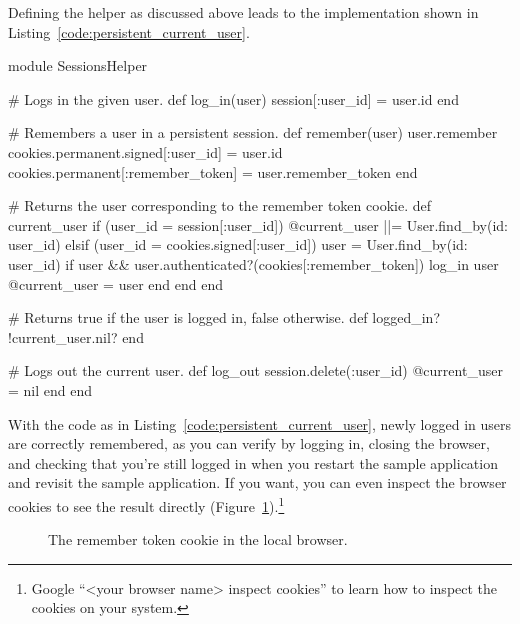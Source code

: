 Defining the  helper as discussed above leads to the implementation shown in Listing~\ref{code:persistent_current_user}.

\begin{codelisting}
\label{code:persistent_current_user}
\begin{code}
module SessionsHelper

  # Logs in the given user.
  def log_in(user)
    session[:user_id] = user.id
  end

  # Remembers a user in a persistent session.
  def remember(user)
    user.remember
    cookies.permanent.signed[:user_id] = user.id
    cookies.permanent[:remember_token] = user.remember_token
  end

  # Returns the user corresponding to the remember token cookie.
  def current_user
    if (user_id = session[:user_id])
      @current_user ||= User.find_by(id: user_id)
    elsif (user_id = cookies.signed[:user_id])
      user = User.find_by(id: user_id)
      if user && user.authenticated?(cookies[:remember_token])
        log_in user
        @current_user = user
      end
    end
  end

  # Returns true if the user is logged in, false otherwise.
  def logged_in?
    !current_user.nil?
  end

  # Logs out the current user.
  def log_out
    session.delete(:user_id)
    @current_user = nil
  end
end
\end{code}
\end{codelisting}

With the code as in Listing~\ref{code:persistent_current_user}, newly logged in users are correctly remembered, as you can verify by logging in, closing the browser, and checking that you're still logged in when you restart the sample application and revisit the sample application. If you want, you can even inspect the browser cookies to see the result directly (Figure~\ref{fig:cookie_in_browser}).\footnote{Google ``<your browser name> inspect cookies'' to learn how to inspect the cookies on your system.}

\begin{figure}
\begin{center}
\end{center}
\caption{The remember token cookie in the local browser.\label{fig:cookie_in_browser}}
\end{figure}

